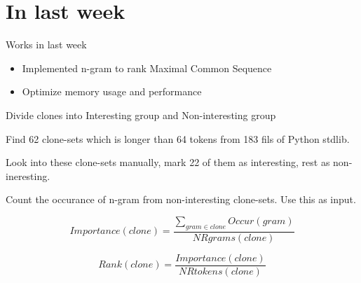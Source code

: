 
\section{In last week} 

\begin{frame}{Works in last week}

\begin{itemize}
\item Implemented n-gram to rank Maximal Common Sequence
\item Optimize memory usage and performance
\end{itemize}


%
%
\end{frame}

\begin{frame}{Divide clones into Interesting group and Non-interesting group}

Find \alert{62} clone-sets which is longer than \alert{64} tokens 
from \alert{183} fils of Python stdlib.

Look into these clone-sets manually, mark \alert{22} of them as 
interesting, rest as non-ineresting.

Count the occurance of n-gram from non-interesting clone-sets. Use this
as input.

\begin{equation}
Importance(clone) = 
\frac{\sum_{gram \in clone} Occur(gram)}{NRgrams(clone)} 
\end{equation}

\begin{equation}
Rank(clone) = \frac{Importance(clone)}{NRtokens(clone)}
\end{equation}
\end{frame}


